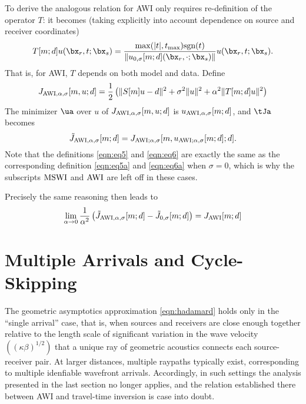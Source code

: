To derive the analogous relation for AWI only requires re-definition
of the operator $T$: it becomes (taking explicitly into account
dependence on source and receiver coordinates)
\begin{equation}
  \label{eqn:eq8}
  T[m;d] u(\bx_r,t;\bx_s) = \frac{\max(|t|, t_{\rm max})
    \mbox{sgn}(t)}{\|u_{0,\sigma}[m;d](\bx_r,\cdot;\bx_s)\|}
  u(\bx_r,t;\bx_s).
\end{equation}
That is, for AWI, $T$ depends on both model and data. Define
\begin{equation}
  \label{eqn:eq5a}
   J_{{\rm AWI},\alpha,\sigma}[m,u;d] = \frac{1}{2}\left(\|S[m]u-d\|^2 +
   \sigma^2\|u\|^2 + \alpha^2\|T[m;d]u\|^2\right)
 \end{equation}
The minimizer $\ua$ over $u$ of $ J_{{\rm AWI}, \alpha,\sigma}[m,u;d]$ is
$u_{{\rm AWI},\alpha,\sigma}[m;d]$, and $\tJa$ becomes
\begin{equation}
  \label{eqn:eq6a}
  \tilde{J}_{{\rm AWI},\alpha,\sigma}[m;d] =
  J_{{\rm AWI};\alpha,\sigma}[m,u_{{\rm AWI};\alpha,\sigma}[m;d];d].
\end{equation}
Note that the definitions \ref{eqn:eq5} and \ref{eqn:eq6} are exactly
the same as the corresponding definition \ref{eqn:eq5a} and
\ref{eqn:eq6a} when $\sigma=0$, which is why the subscripts ${\rm
  MSWI}$ and ${\rm AWI}$ are left off in these cases.

Precisely the
same reasoning then leads to
\begin{equation}
  \label{eq9}
  \lim_{\alpha \rightarrow 0}
  \frac{1}{\alpha^2}\left(\tilde{J}_{{\rm AWI},\alpha,\sigma}[m;d]-\tilde{J}_{0,\sigma}[m;d]\right)=
  J_{\rm AWI}[m;d]
\end{equation}

\section{Multiple Arrivals and Cycle-Skipping}
The geometric asymptotics approximation \ref{eqn:hadamard} holds only
in the ``single arrival'' case, that is, when sources and receivers
are close enough together relative to the length scale of significant
variation in the wave velocity $((\kappa\beta)^{1/2})$ that a unique ray of
geometric acoustics connects each source-receiver pair. At larger
distances, multiple raypaths typically exist, corresponding to
multiple idenfiable wavefront arrivals. Accordingly, in such settings
the analysis presented in the last section no longer applies, and the
relation established there between AWI and travel-time inversion is
case into doubt.


